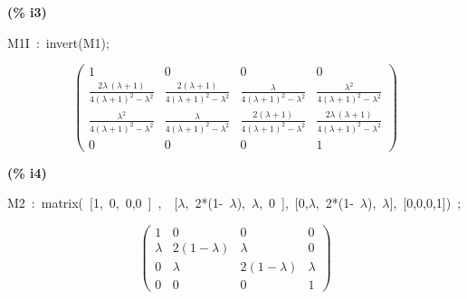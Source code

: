 \documentclass[fleqn]{article}
\begin{document}
\noindent
\begin{minipage}[t]{4.000000em}\color{red}\bfseries
(\% i3)	
\end{minipage}
\begin{minipage}[t]{\textwidth}\color{blue}
M1I\ :\ invert(M1);
\end{minipage}
\[\displaystyle \tag{\% o3} 
\begin{pmatrix}1 & 0 & 0 & 0\\
\frac{2 \lambda \, \left( \lambda +1\right) }{4 {{\left( \lambda +1\right) }^{2}}-{{\lambda }^{2}}} & \frac{2 \left( \lambda +1\right) }{4 {{\left( \lambda +1\right) }^{2}}-{{\lambda }^{2}}} & \frac{\lambda }{4 {{\left( \lambda +1\right) }^{2}}-{{\lambda }^{2}}} & \frac{{{\lambda }^{2}}}{4 {{\left( \lambda +1\right) }^{2}}-{{\lambda }^{2}}}\\
\frac{{{\lambda }^{2}}}{4 {{\left( \lambda +1\right) }^{2}}-{{\lambda }^{2}}} & \frac{\lambda }{4 {{\left( \lambda +1\right) }^{2}}-{{\lambda }^{2}}} & \frac{2 \left( \lambda +1\right) }{4 {{\left( \lambda +1\right) }^{2}}-{{\lambda }^{2}}} & \frac{2 \lambda \, \left( \lambda +1\right) }{4 {{\left( \lambda +1\right) }^{2}}-{{\lambda }^{2}}}\\
0 & 0 & 0 & 1\end{pmatrix}\mbox{}
\]


\noindent
\begin{minipage}[t]{4.000000em}\color{red}\bfseries
(\% i4)	
\end{minipage}
\begin{minipage}[t]{\textwidth}\color{blue}
M2\ :\ matrix(\ [1,\ 0,\ 0,0\ ]\ ,\ \ [\ensuremath{\lambda},\ 2*(1-\ \ensuremath{\lambda}),\ \ensuremath{\lambda},\ 0\ ],\ [0,\ensuremath{\lambda},\ 2*(1-\ \ensuremath{\lambda}),\ \ensuremath{\lambda}],\ [0,0,0,1])\ ;
\end{minipage}
\[\displaystyle \tag{\% o4} 
\begin{pmatrix}1 & 0 & 0 & 0\\
\lambda  & 2 \left( 1-\lambda \right)  & \lambda  & 0\\
0 & \lambda  & 2 \left( 1-\lambda \right)  & \lambda \\
0 & 0 & 0 & 1\end{pmatrix}\mbox{}
\]
\end{document}
